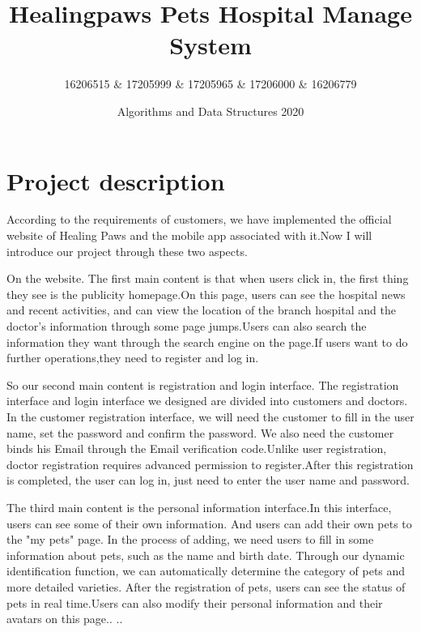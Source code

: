 \documentclass[a4paper]{article}
\begin{document}
\title{Healingpaws Pets Hospital Manage System}
\author{16206515 \& 17205999 \& 17205965 \& 17206000 \& 16206779}
\date{Algorithms and Data Structures 2020}

\maketitle



\section{Project description}

According to the requirements of customers, we have implemented the official website of Healing Paws and the mobile app associated with it.Now I will introduce our project through these two aspects.

On the website. The first main content is that when users click in, the first thing they see is the publicity homepage.On this page, users can see the hospital news and recent activities, and can view the location of the branch hospital and the doctor's information through some page jumps.Users can also search the information they want through the search engine on the page.If users want to do further operations,they need to register and log in.

So our second main content is registration and login interface. The registration interface and login interface we designed are divided into customers and doctors. In the customer registration interface, we will need the customer to fill in the user name, set the password and confirm the password. We also need the customer binds his Email through the Email verification code.Unlike user registration, doctor registration requires advanced permission to register.After this registration is completed, the user can log in, just need to enter the user name and password. 

The third main content is the personal information interface.In this interface, users can see some of their own information. And users can add their own pets to the "my pets" page. In the process of adding, we need users to fill in some information about pets, such as the name and birth date. Through our dynamic identification function, we can automatically determine the category of pets and more detailed varieties. After the registration of pets, users can see the status of pets in real time.Users can also modify their personal information and their avatars on this page..
..
\end{document}
